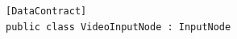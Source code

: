 \begin{verbatim}
[DataContract]
public class VideoInputNode : InputNode
\end{verbatim}
%
%
%
%
%
%
%


